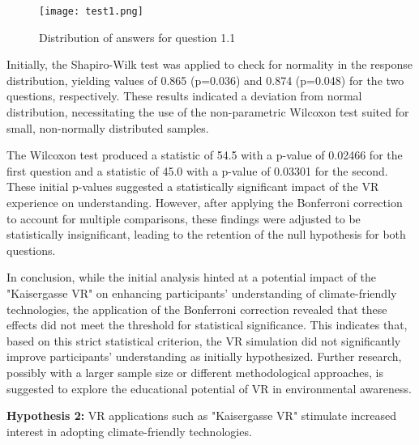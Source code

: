 \documentclass[draft, final]{vutinfth} %
\begin{document}
\begin{figure}[h]
  \centering
  \texttt{[image: test1.png]}
  \caption[Distribution of answers for question 1.1]{Distribution of answers for question 1.1}
  \label{fig:analysis-image}
\end{figure}

Initially, the Shapiro-Wilk test was applied to check for normality in the response distribution, yielding values of 0.865 (p=0.036) and 0.874 (p=0.048) for the two questions, respectively. These results indicated a deviation from normal distribution, necessitating the use of the non-parametric Wilcoxon test suited for small, non-normally distributed samples.

The Wilcoxon test produced a statistic of 54.5 with a p-value of 0.02466 for the first question and a statistic of 45.0 with a p-value of 0.03301 for the second. These initial p-values suggested a statistically significant impact of the VR experience on understanding. However, after applying the Bonferroni correction to account for multiple comparisons, these findings were adjusted to be statistically insignificant, leading to the retention of the null hypothesis for both questions.

In conclusion, while the initial analysis hinted at a potential impact of the "Kaisergasse VR" on enhancing participants' understanding of climate-friendly technologies, the application of the Bonferroni correction revealed that these effects did not meet the threshold for statistical significance. This indicates that, based on this strict statistical criterion, the VR simulation did not significantly improve participants' understanding as initially hypothesized. Further research, possibly with a larger sample size or different methodological approaches, is suggested to explore the educational potential of VR in environmental awareness.


\textbf{Hypothesis 2:} VR applications such as "Kaisergasse VR" stimulate increased interest in adopting climate-friendly technologies.
\end{document}
